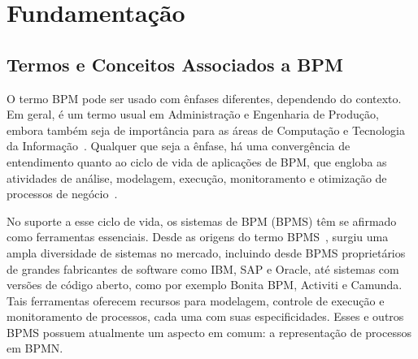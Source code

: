 \documentclass[12pt]{article}
\begin{document}



\section{Fundamentação}
\subsection{Termos e Conceitos Associados a BPM} \label{sec:bpm}

O termo BPM pode ser usado com ênfases diferentes, dependendo do contexto. Em geral, é um termo usual em Administração e Engenharia de Produção, embora também seja de importância para as áreas de Computação e Tecnologia da Informação~\cite{sbqs2015:bpms}. Qualquer que seja a ênfase, há uma convergência de entendimento quanto ao ciclo de vida de aplicações de BPM, que engloba as atividades de análise, modelagem, execução, monitoramento e otimização de processos de negócio~\cite{ABPMP}. 

No suporte a esse ciclo de vida, os sistemas de BPM (BPMS) têm se afirmado como ferramentas essenciais. Desde as origens do termo BPMS~\cite{thirdwave:2003}, surgiu uma ampla diversidade de sistemas no mercado, incluindo desde BPMS proprietários de grandes fabricantes de software como IBM, SAP e Oracle, até sistemas com versões de código aberto, como por exemplo Bonita BPM, Activiti e Camunda. Tais ferramentas oferecem recursos para modelagem, controle de execução e monitoramento de processos, cada uma com suas especificidades. Esses e outros BPMS possuem atualmente um aspecto em comum: a representação de processos em BPMN.
\end{document}
